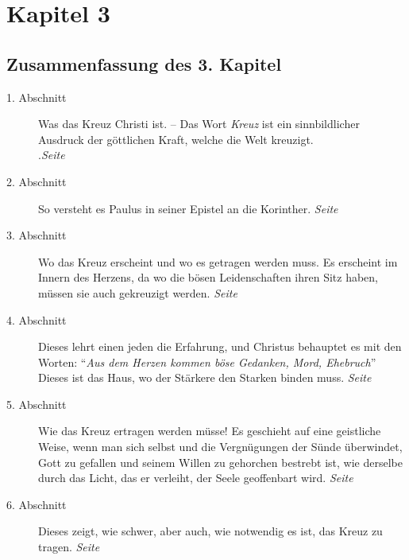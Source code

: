 

\chapter{Kapitel 3} \label{kap3}

\section{Zusammenfassung des 3. Kapitel}


\begin{description}
\item[1. Abschnitt] Was das Kreuz Christi ist. -- Das Wort \textit{Kreuz} ist
ein sinnbildlicher 
Ausdruck der göttlichen Kraft, welche die Welt kreuzigt.
\\.\dotfill \textit{Seite~\pageref{kap3_ab1}}\\
\item[2. Abschnitt] So versteht es Paulus in seiner Epistel an die
Korinther.
\dotfill \textit{Seite~\pageref{kap3_ab2}}\\
\item[3. Abschnitt] Wo das Kreuz erscheint und wo es getragen werden muss. Es
erscheint im Innern des Herzens, da wo die bösen Leidenschaften ihren Sitz
haben,
müssen sie auch gekreuzigt werden.
\dotfill \textit{Seite~\pageref{kap3_ab3}}\\
\item[4. Abschnitt] Dieses lehrt einen jeden
die Erfahrung, und Christus
behauptet es mit den Worten: "`\textit{Aus dem Herzen kommen
böse Gedanken, Mord,
Ehebruch}"' Dieses ist das Haus, wo der Stärkere den Starken binden muss.
\dotfill \textit{Seite~\pageref{kap3_ab4}}\\
\item[5. Abschnitt] Wie das Kreuz ertragen werden müsse! Es geschieht auf eine
geistliche Weise, wenn man sich selbst und die Vergnügungen der Sünde
überwindet, Gott zu
gefallen und
seinem Willen zu gehorchen bestrebt ist, wie
derselbe durch das Licht, das er verleiht, der Seele geoffenbart wird.
\dotfill \textit{Seite~\pageref{kap3_ab5}}\\
\item[6. Abschnitt] Dieses zeigt, wie schwer, aber auch, wie notwendig es ist,
das Kreuz zu tragen.
\dotfill \textit{Seite~\pageref{kap3_ab6}}\\
\end{description}

